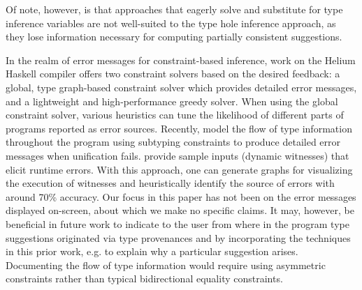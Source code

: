 Of note, however, is that approaches that eagerly solve and substitute for type inference variables \cite{odersky1999,pottier2014,mcadam1999} are not well-suited to the type hole inference approach, as they lose information necessary for computing partially consistent suggestions. 


In the realm of error messages for constraint-based inference, work on the Helium Haskell compiler \cite{heeren2003} offers two constraint solvers based on the desired feedback: a global, type graph-based constraint solver which provides detailed error messages, and a lightweight and high-performance greedy solver. When using the global constraint solver, various heuristics can tune the likelihood of different parts of programs reported as error sources.
Recently, \citet{bhanuka2023} model the flow of type information throughout the program using subtyping constraints to produce detailed error messages when unification fails. \citet{seidel2016} provide sample inputs (dynamic witnesses) that elicit runtime errors. With this approach, one can generate graphs for visualizing the execution of witnesses and heuristically identify the source of errors with around 70\% accuracy.
Our focus in this paper has not been on the error messages displayed on-screen, about which we make no specific claims.
It may, however, be beneficial in future work to indicate to the user from where in the program type suggestions originated via type provenances and by incorporating the techniques in this prior work, e.g. to explain why a particular suggestion arises. Documenting the flow of type information would require using asymmetric constraints rather than typical bidirectional equality constraints. 
